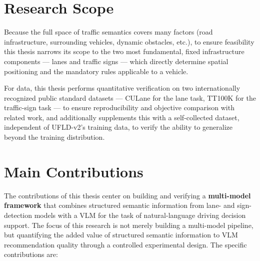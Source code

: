 \documentclass[12pt,a4paper]{report}
\begin{document}
\section{Research Scope}

Because the full space of traffic semantics covers many factors (road infrastructure, surrounding vehicles, dynamic obstacles, etc.), to ensure feasibility this thesis narrows its scope to the two most fundamental, fixed infrastructure components --- lanes and traffic signs --- which directly determine spatial positioning and the mandatory rules applicable to a vehicle.

For data, this thesis performs quantitative verification on two internationally recognized public standard datasets --- CULane \cite{pan2018culane} for the lane task, TT100K \cite{zhu2016tt100k} for the traffic-sign task --- to ensure reproducibility and objective comparison with related work, and additionally supplements this with a self-collected dataset, independent of UFLD-v2's training data, to verify the ability to generalize beyond the training distribution.

\section{Main Contributions}

The contributions of this thesis center on building and verifying a \textbf{multi-model framework} that combines structured semantic information from lane- and sign-detection models with a VLM for the task of natural-language driving decision support. The focus of this research is not merely building a multi-model pipeline, but quantifying the added value of structured semantic information to VLM recommendation quality through a controlled experimental design. The specific contributions are:
\end{document}
